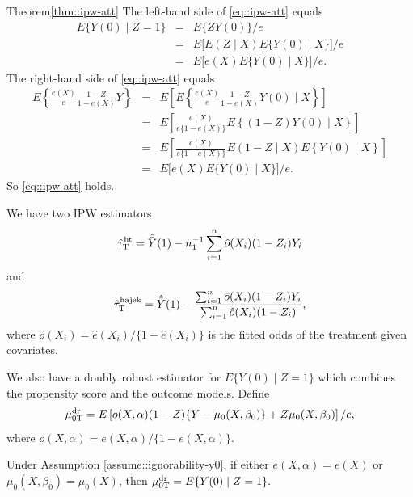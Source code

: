 \begin{myproof}{Theorem}{\ref{thm::ipw-att}} 
The left-hand side of \eqref{eq::ipw-att} equals
\begin{eqnarray*}
E\{ Y(0) \mid Z=1 \} &=& E\{ ZY(0)   \} /e \\
&=& E\big[  E( Z \mid X) E\{ Y(0) \mid X  \} \big] /e \\
&=&E\big[ e(X)  E\{ Y(0) \mid X  \} \big] /e . 
\end{eqnarray*}
The right-hand side of \eqref{eq::ipw-att} equals 
\begin{eqnarray*}
E\left\{         \frac{e(X)}{e}  \frac{1-Z}{1-e(X)} Y \right\} 
&=& E\left[  E\left\{         \frac{e(X)}{e}  \frac{1-Z}{1-e(X)} Y(0) \mid X \right\}  \right]\\
&=& E\left[   \frac{e(X)}{e \{1-e(X)\} }   E\left\{       (1-Z)Y(0) \mid X \right\}  \right]\\
&=& E\left[   \frac{e(X)}{e \{1-e(X)\} }   E(      1-Z\mid X )   E\left\{       Y(0) \mid X \right\}  \right]\\
&=& E\big[ e(X)  E\{ Y(0) \mid X  \} \big] /e .  
\end{eqnarray*}
So \eqref{eq::ipw-att}  holds. 
\end{myproof}




We have two  IPW  estimators  
$$
\hat{\tau}_\textsc{T}^\text{ht} =  \hat{\bar{Y}}(1) - n_1^{-1} \sum_{i=1}^n \hat{o}(X_i) (1-Z_i) Y_i
$$
and
$$
\hat{\tau}_\textsc{T}^\text{hajek} = \hat{\bar{Y}}(1) 
- \frac{  \sum_{i=1}^n \hat{o}(X_i) (1-Z_i) Y_i }{ \sum_{i=1}^n \hat{o}(X_i) (1-Z_i) } ,
$$
where $\hat{o}(X_i) = \hat{e}(X_i) / \{ 1 - \hat{e}(X_i)  \} $ is the fitted odds of the treatment given covariates. 

 
 



We also have a doubly robust estimator for $E\{  Y(0)\mid Z=1\}$ which combines the propensity score and the outcome models. Define
\begin{eqnarray}
\label{eq::dr-att-mu0}
\tilde{\mu}_{0\textsc{T}}^\textup{dr} = E\left[ o(X,\alpha)  (1-Z) \{ Y - \mu_0(X, \beta_0) \}     + Z  \mu_0(X, \beta_0) \right] /e, 
\end{eqnarray}
where $o(X,\alpha)  = e(X,\alpha)/ \{ 1 - e(X,\alpha)\}.$

\begin{theorem}
\label{thm::dr-att}
Under Assumption \ref{assume::ignorability-y0}, if either $ e(X,\alpha) = e(X)$ or $\mu_0(X, \beta_0)=\mu_0(X) $, then $\mu_{0\textsc{T}}^\text{dr}  = E\{ Y(0) \mid Z=1 \}.$
\end{theorem}


